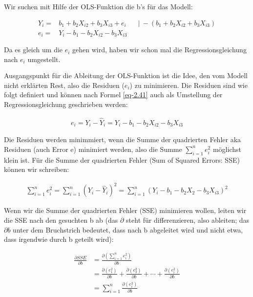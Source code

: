 \documentclass[
  10pt,
  letterpaper,
  a4paper, twoside]{scrreprt}
\begin{document}
\begin{tcolorbox}[enhanced jigsaw, coltitle=black, opacitybacktitle=0.6, toptitle=1mm, colbacktitle=quarto-callout-warning-color!10!white, colback=white, toprule=.15mm, opacityback=0, bottomrule=.15mm, arc=.35mm, colframe=quarto-callout-warning-color-frame, leftrule=.75mm, titlerule=0mm, breakable, left=2mm, rightrule=.15mm, title={IYI (∉ Klausur): Ableitung der OLS-Funktion}, bottomtitle=1mm]

Wir suchen mit Hilfe der OLS-Funktion die b's für das Modell:

\begin{align}
Y_i = & b_1 + b_2X_{i2} + b_3X_{i3} + e_i  &&|\ -(b_1 + b_2X_{i2} + b_3X_{i3}) \\
e_i = & Y_i - b_1 - b_2X_{i2} - b_3X_{i3} \label{eq-2.41}
\end{align}

Da es gleich um die \(e_i\) gehen wird, haben wir schon mal die
Regressionsgleichung nach \(e_i\) umgestellt.

Ausgangspunkt für die Ableitung der OLS-Funktion ist die Idee, den vom
Modell nicht erklärten Rest, also die Residuen (\(e_i\)) zu minimieren.
Die Residuen sind wie folgt definiert und können nach Formel
\eqref{eq-2.41} auch als Umstellung der Regressionsgleichung geschrieben
werden:

\begin{align}
e_i=Y_i-\hat{Y}_i=Y_i-b_1-b_2 X_{i 2}-b_3 X_{i 3} \label{eq-2.4}
\end{align}

Die Residuen werden minimmiert, wenn die Summe der quadrierten Fehler
aka Residuen (auch Error e) minimiert werden, also die Summe
\(\sum_{i=1}^n e_i^2\) möglichst klein ist. Für die Summe der
quadrierten Fehler (Sum of Squared Errors: SSE) können wir schreiben:

\begin{align}
\sum_{i=1}^n e_i^2=\sum_{i=1}^n\left(Y_i-\hat{Y}_i\right)^2=\sum_{i=1}^n\left(Y_i-b_1-b_2 X_2-b_3 X_{i 3}\right)^2 \label{eq-2.5}
\end{align}

Wenn wir die Summe der quadrierten Fehler (SSE) minimieren wollen,
leiten wir die SSE nach den gesuchten b ab (das \(\partial\) steht für
differenzieren, also ableiten; das \(\partial b\) unter dem Bruchstrich
bedeutet, dass nach b abgeleitet wird und nicht etwa, dass irgendwie
durch b geteilt wird):

\begin{align}
\frac{\partial S S E}{\partial b}&=\frac{\partial\left(\sum_{i=1}^n e_i^2\right)}{\partial b}\\
{}&=\frac{\partial\left(e_1^2\right)}{\partial b}+\frac{\partial\left(e_2^2\right)}{\partial b}+\cdots+\frac{\partial\left(e_i^2\right)}{\partial b}\\
{}& =\sum_{i=1}^n \frac{\partial\left(e_i^2\right)}{\partial b} \label{eq-2.6}
\end{align}


\end{tcolorbox}
\end{document}
